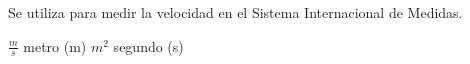 
\question Se utiliza para medir la velocidad en el Sistema Internacional de
Medidas.

  \begin{oneparchoices}
    \CorrectChoice $\frac{m}{s}$
    \choice metro (m)
    \choice $m^2$
    \choice segundo (s)
  \end{oneparchoices}
  \answerline[A]

